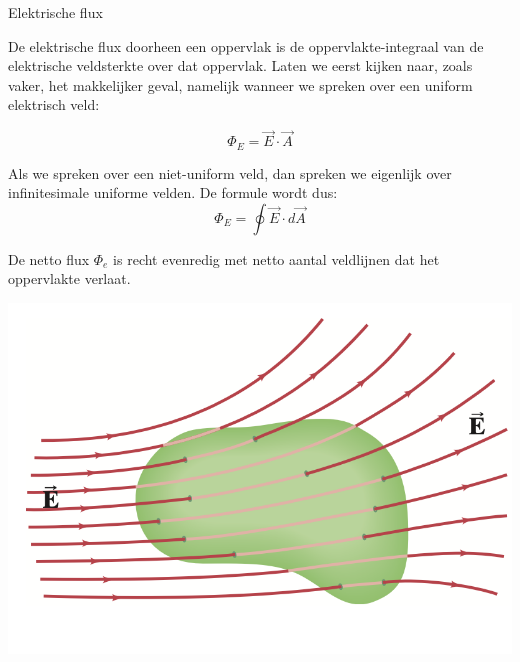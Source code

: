 \begin{theo}{Elektrische flux}

    
    De elektrische flux doorheen een oppervlak is de oppervlakte-integraal van de elektrische veldsterkte over dat oppervlak. Laten we eerst kijken naar, zoals vaker, het makkelijker geval, namelijk wanneer we spreken over een uniform elektrisch veld:
    
    \begin{equation*}
        \Phi_E = \Vec{E}\cdot\Vec{A}
    \end{equation*}
    
    \noindent Als we spreken over een niet-uniform veld, dan spreken we eigenlijk over infinitesimale uniforme velden. De formule wordt dus:
    \begin{equation*}
        \Phi_E = \oint \Vec{E}\cdot d\Vec{A}
    \end{equation*}
    
    \noindent De netto flux $ \Phi_e $ is recht evenredig met netto aantal veldlijnen dat het oppervlakte verlaat.
    
        \begin{center}
            \includegraphics[scale = 0.35]{Images/Elektriciteit/OppervlakteGeenLading.png}
        \end{center}
\end{theo}


